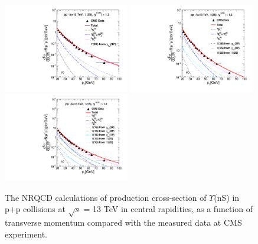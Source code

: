 \begin{figure}
  \centering
  \includegraphics[width=0.49\textwidth]{Figures/NRQCD_Beauty/Fig3c_Y3S_CMS_13TeV_Rap12.pdf}
  \includegraphics[width=0.49\textwidth]{Figures/NRQCD_Beauty/Fig6c_CMS_D2NDPtDy_Y2S_13TeV_Y0012_Pt.pdf}
  \includegraphics[width=0.49\textwidth]{Figures/NRQCD_Beauty/Fig8c_CMS_D2NDPtDy_Y1S_13TeV_Y0012_Pt.pdf}
  \caption{\small{The NRQCD calculations of production cross-section of $\Upsilon$(nS) in p+p collisions at 
      $\sqrt{s}$ = 13 TeV in central rapidities, as a function of transverse momentum compared with the measured data 
      at CMS~\cite{Sirunyan:2017qdw} experiment.}}
  \label{Fig:SigmaYnSCMS13TeV}
\end{figure}


